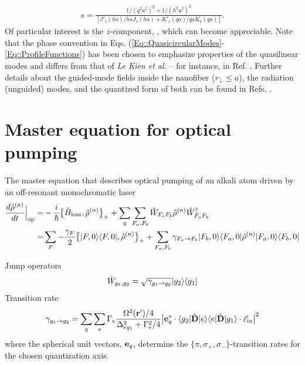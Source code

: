 \documentclass[preprint,aps,pra,onecolumn]{revtex4-1} %
\newcommand{\inp}{{\rm in}}
\newcommand{\change}[1]{{\color{RoyalBlue} #1}}
\begin{document}
\begin{appendix}
	\begin{align}
		s = \frac{1/(q^2 a^2)^{2} + 1/(h^2 a^2)^{2}}{[J'_1(ha)/haJ_1(ha) + K'_1(qa)/qaK_1(qa)]}.
	\end{align}  
Of particular interest is the $z$-component, , which can become appreciable.  Note that the phase convention in Eqs. (\ref{Eq::QuasicircularModes}-\ref{Eq::ProfileFunctions}) has been chosen to emphasize properties of the quasilinear modes and differs from that of \emph{Le Kien et al.} -- for instance, in Ref. \cite{le_kien_propagation_2014}.  Further details about the guided-mode fields inside the nanofiber ($r_\perp\leq a$), the radiation (unguided) modes, and the quantized form of both can be found in Refs. \cite{sondergaard_general_2001, tong_single-mode_2004, kien_field_2004, le_kien_spontaneous_2005, Vetsch thesis}.

\change{
\section{Master equation for optical pumping} \label{Appendix::Optical pumping}

The master equation that describes optical pumping of an alkali atom driven by an off-resonant monochromatic laser \cite{deutsch_quantum_2010}
	\begin{align}
		\frac{d \hat{\rho}^{(n)}  }{dt}\Big|_{\rm op} = 
		&-\frac{i}{\hbar} \big\{ \hat{H}_{\rm loss},\hat{\rho}^{(n)} \big\}_+ + \sum_q \sum_{F_a,F_b} \hat{W}_{F_aF_b} \hat{\rho}^{(n)} \hat{W}^\dagger_{F_aF_b} \\
		= & \sum_{F} -\frac{\gamma_F}{2} \big\{ \lvert{F,0}\rangle\langle{F,0}\rvert,\hat{\rho}^{(n)} \big\}_+ + \sum_{F_a,F_b} \gamma_{F_a \rightarrow F_b} \lvert{F_b,0}\rangle\langle{F_a,0}\rvert \hat{\rho}^{(n)} \lvert{F_a,0}\rangle\langle{F_b,0}\rvert \\
	\end{align}	
		
Jump operators
	\begin{align}
		\hat{W}_{g_1,g_2} = \sqrt{\gamma_{g_1 \rightarrow g_2}} \lvert{g_2}\rangle\langle{g_1}\rvert
	\end{align}
Transition rate
	\begin{align}
		\gamma_{g_1 \rightarrow g_2} = \sum_q \sum_e \Gamma_e \frac{ \Omega^2(\mathbf{r}')/4}{\Delta^2_{eg_1} + \Gamma^2_e/4} \big|  \mbf{e}_q^* \cdot \bra{g_2} \hat{\mbf{D}} \op{e}{e}\hat{\mbf{D}}  \ket{g_1} \cdot \vec{\varepsilon}_\inp \big|^2
	\end{align}
where the spherical unit vectors, $\mathbf{e}_q$, determine the $\{\pi, \sigma_+, \sigma_-\}$-transition rates for the chosen quantization axis.


}
\end{appendix}
\end{document}
